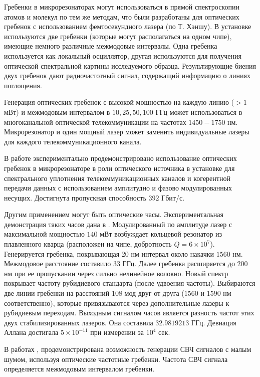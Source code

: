 Гребенки в микрорезонаторах могут использоваться в прямой спектроскопии атомов и молекул по тем же методам, что были разработаны для оптических гребенок с использованием фемтосекундного лазера (по Т. Хэншу). В установке используются две гребенки (которые могут располагаться на одном чипе), имеющие немного различные межмодовые интервалы. Одна гребенка используется как локальный осциллятор, другая используются для получения оптической спектральной картины исследуемого образца. Результирующие биения двух гребенок дают радиочастотный сигнал, содержащий информацию о линиях поглощения.

Генерация оптических гребенок с высокой мощностью на каждую линию ($>1$ мВт) и межмодовым интервалом в $10,25,50,100$ ГГц может использоваться в многоканальной оптической телекоммуникации на частотах $1450-1750$ нм. Микрорезонатор и один мощный лазер может заменить индивидуальные лазеры для каждого телекоммуникационного канала.

В работе \cite{coherent_data_transmission} экспериментально продемонстрировано использование оптических гребенок в микрорезонаторе в роли оптического источника в установке для спектрального уплотнения телекоммуникационных каналов и когерентной передачи данных с использованием амплитудно и фазово модулированных несущих. Достигнута пропускная способность $392$ Гбит/с.

Другим применением могут быть оптические часы. Экспериментальная демонстрация таких часов дана в \cite{frequency_comb_optical_clock}. Модулированный по амплитуде лазер с максимальной мощностью $140$ мВт возбуждает кольцевой резонатор из плавленного кварца (расположен на чипе, добротность $Q=6\times10^7$). Генерируется гребенка, покрывающая $20$ нм интервал около накачки $1560$ нм. Межмодовое расстояние составило $33$ ГГц. Далее гребенка расширяется до $200$ нм при ее пропускании через сильно нелинейное волокно. Новый спектр покрывает частоту рубидиевого стандарта (после удвоения частоты). Выбираются две линии гребенки на расстояний 108 мод друг от друга ($1560$ и $1590$ нм соответственно), которые привязываются через дополнительные лазеры к рубидиевым переходам. Выходным сигналом часов является разность частот этих двух стабилизированных лазеров. Она составила $32.9819213$ ГГц. Девиация Аллана достигала $5\times10^{-11}$ при измерении за $10^4$ сек.

В работах \cite{MLG_nature_2012}, \cite{mw_signals_generation} продемонстрирована возможность генерации СВЧ сигналов с малым шумом, используя оптические частотные гребенки. Частота СВЧ сигнала определяется межмодовым интервалом гребенки.



